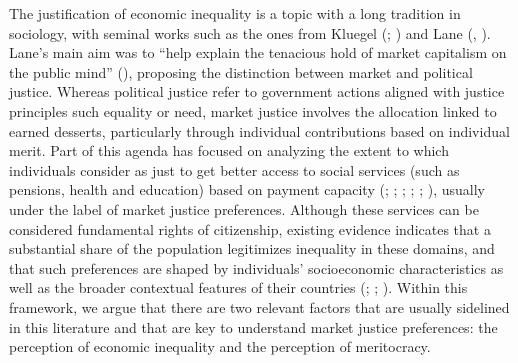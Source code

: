 \documentclass[
  12pt,
]{article}
\begin{document}
The justification of economic inequality is a topic with a long
tradition in sociology, with seminal works such as the ones from Kluegel
(;
) and Lane
(,
). Lane's main aim was to ``help
explain the tenacious hold of market capitalism on the public mind''
(), proposing the
distinction between market and political justice. Whereas political
justice refer to government actions aligned with justice principles such
equality or need, market justice involves the allocation linked to
earned desserts, particularly through individual contributions based on
individual merit. Part of this agenda has focused on analyzing the
extent to which individuals consider as just to get better access to
social services (such as pensions, health and education) based on
payment capacity (;
;
;
;
;
), usually
under the label of market justice preferences. Although these services
can be considered fundamental rights of citizenship, existing evidence
indicates that a substantial share of the population legitimizes
inequality in these domains, and that such preferences are shaped by
individuals' socioeconomic characteristics as well as the broader
contextual features of their countries
(;
;
). Within this framework,
we argue that there are two relevant factors that are usually sidelined
in this literature and that are key to understand market justice
preferences: the perception of economic inequality and the perception of
meritocracy.
\end{document}
